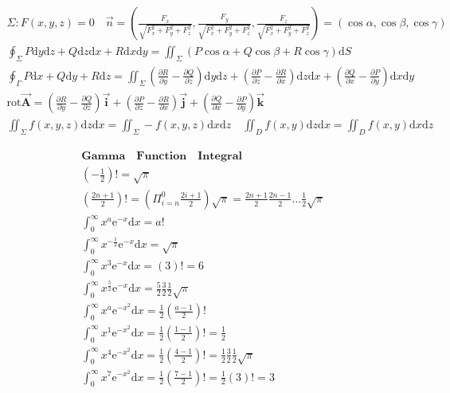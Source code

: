 \documentclass{article}
\begin{document}
\begin{align*}
    \Sigma:F(x,y,z)=0 \quad \vec{n}=\left(\frac{F_{x}}{\sqrt{F_{x}^2+F_{y}^2+F_{z}^2}},\frac{F_{y}}{\sqrt{F_{x}^2+F_{y}^2+F_{z}^2}},\frac{F_{z}}{\sqrt{F_{x}^2+F_{y}^2+F_{z}^2}}\right) = (\cos \alpha,\cos \beta,\cos \gamma)\\
    \oint_{\Sigma}P\mathrm{d}y\mathrm{d}z+Q\mathrm{d}z\mathrm{d}x+R\mathrm{d}x\mathrm{d}y = \iint_{\Sigma}(P\cos \alpha+Q\cos \beta+R\cos \gamma )\mathrm{d}S\\  
    \oint_{\Gamma}P\mathrm{d}x+Q\mathrm{d}y +R\mathrm{d}z = \iint_{\Sigma}\left(\frac{\partial R}{\partial y}-\frac{\partial Q}{\partial z}\right)\mathrm{d}y\mathrm{d}z+\left(\frac{\partial P}{\partial z}-\frac{\partial R}{\partial x}\right)\mathrm{d}z\mathrm{d}x+\left(\frac{\partial Q}{\partial x}-\frac{\partial P}{\partial y}\right)\mathrm{d}x\mathrm{d}y \\
    \mathbf{\mathrm{rot}\vec{A}} = \left(\frac{\partial R}{\partial y}-\frac{\partial Q}{\partial z}\right)\mathbf{\vec{i}}+\left(\frac{\partial P}{\partial z}-\frac{\partial R}{\partial x}\right)\mathbf{\vec{j}}+\left(\frac{\partial Q}{\partial x}-\frac{\partial P}{\partial y}\right)\mathbf{\vec{k}}\\
    \iint_{\Sigma} f(x,y,z) \mathrm{d}z\mathrm{d}x = \iint_{\Sigma} -f(x,y,z) \mathrm{d}x\mathrm{d}z \quad \iint_{D}f(x,y)\mathrm{d}z\mathrm{d}x = \iint_{D}f(x,y)\mathrm{d}x\mathrm{d}z
\end{align*}

\clearpage 

\begin{align*}
    \mathbf{Gamma \quad Function \quad Integral} \\ 
    \left(-\frac{1}{2}\right)! = \sqrt{\pi} \\ 
    \left(\frac{2n+1}{2}\right)! = \left(\Pi_{i=n}^{0}{\frac{2i+1}{2}}\right)\sqrt{\pi} = \frac{2n+1}{2}\frac{2n-1}{2}\dots\frac{1}{2}\sqrt{\pi} \\ 
    \int_{0}^{\infty} x^{a}\mathrm{e}^{-x}\mathrm{d}x = a! \\
    \int_{0}^{\infty} x^{-\frac{1}{2}}\mathrm{e}^{-x}\mathrm{d}x = \sqrt{\pi}\\ 
    \int_{0}^{\infty} x^{3}\mathrm{e}^{-x}\mathrm{d}x = (3)! = 6 \\ 
    \int_{0}^{\infty} x^{\frac{5}{2}}\mathrm{e}^{-x}\mathrm{d}x = \frac{5}{2}\frac{3}{2}\frac{1}{2}\sqrt{\pi}\\  
    \int_{0}^{\infty} x^{a}\mathrm{e}^{-x^2}\mathrm{d}x = \frac{1}{2} \left(\frac{a-1}{2}\right)! \\ 
    \int_{0}^{\infty} x^{1}\mathrm{e}^{-x^2}\mathrm{d}x = \frac{1}{2} \left(\frac{1-1}{2}\right)! = \frac{1}{2} \\
    \int_{0}^{\infty} x^{4}\mathrm{e}^{-x^2}\mathrm{d}x = \frac{1}{2} \left(\frac{4-1}{2}\right)! = \frac{1}{2}\frac{3}{2}\frac{1}{2}\sqrt{\pi}\\ 
    \int_{0}^{\infty} x^{7}\mathrm{e}^{-x^2}\mathrm{d}x = \frac{1}{2} \left(\frac{7-1}{2}\right)! = \frac{1}{2}(3)! = 3\\
\end{align*}
\end{document}

